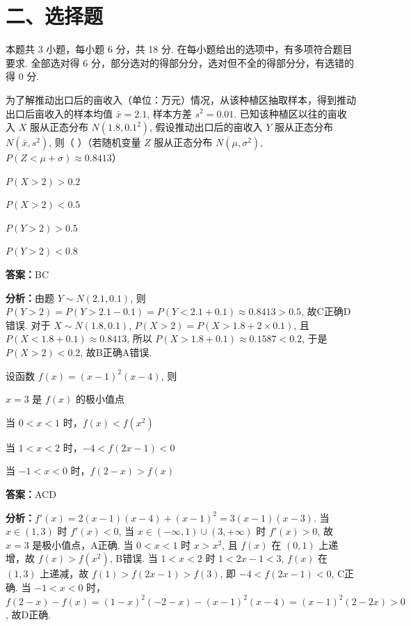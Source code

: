 \section*{二、选择题}
本题共 3 小题，每小题 6 分，共 18 分. 在每小题给出的选项中，有多项符合题目要求. 全部选对得 6 分，部分选对的得部分分，选对但不全的得部分分，有选错的得 0 分.

\begin{question}[points=6]
为了解推动出口后的亩收入（单位：万元）情况，从该种植区抽取样本，得到推动出口后亩收入的样本均值 $\bar{x}=2.1$, 样本方差 $s^2=0.01$. 已知该种植区以往的亩收入 $X$ 服从正态分布 $N(1.8, 0.1^2)$, 假设推动出口后的亩收入 $Y$ 服从正态分布 $N(\bar{x}, s^2)$, 则（ ）（若随机变量 $Z$ 服从正态分布 $N(\mu, \sigma^2)$, $P(Z < \mu+\sigma) \approx 0.8413$）
\begin{choices}
  \item $P(X > 2) > 0.2$
  \item $P(X > 2) < 0.5$
  \item $P(Y > 2) > 0.5$
  \item $P(Y > 2) < 0.8$
\end{choices}
\begin{solution}
\textbf{答案：}BC

\textbf{分析：}由题 $Y \sim N(2.1, 0.1)$, 则 $P(Y > 2) = P(Y > 2.1 - 0.1) = P(Y < 2.1+0.1) \approx 0.8413 > 0.5$, 故C正确D错误. 对于 $X \sim N(1.8, 0.1)$, $P(X>2) = P(X > 1.8+2\times 0.1)$, 且 $P(X < 1.8+0.1) \approx 0.8413$, 所以 $P(X > 1.8+0.1) \approx 0.1587 < 0.2$, 于是 $P(X>2) < 0.2$, 故B正确A错误.
\end{solution}
\end{question}

\begin{question}[points=6]
设函数 $f(x) = (x-1)^2(x-4)$, 则
\begin{choices}
  \item $x=3$ 是 $f(x)$ 的极小值点
  \item 当 $0 < x < 1$ 时，$f(x) < f(x^2)$
  \item 当 $1 < x < 2$ 时，$-4 < f(2x-1) < 0$
  \item 当 $-1 < x < 0$ 时，$f(2-x) > f(x)$
\end{choices}
\begin{solution}
\textbf{答案：}ACD

\textbf{分析：}$f'(x) = 2(x-1)(x-4) + (x-1)^2 = 3(x-1)(x-3)$. 当 $x \in (1,3)$ 时 $f'(x) < 0$, 当 $x \in (-\infty,1) \cup (3,+\infty)$ 时 $f'(x) > 0$, 故 $x=3$ 是极小值点，A正确. 当 $0<x<1$ 时 $x > x^2$, 且 $f(x)$ 在 $(0,1)$ 上递增，故 $f(x) > f(x^2)$, B错误. 当 $1<x<2$ 时 $1<2x-1<3$, $f(x)$ 在 $(1,3)$ 上递减，故 $f(1) > f(2x-1) > f(3)$, 即 $-4 < f(2x-1) < 0$, C正确. 当 $-1<x<0$ 时，$f(2-x) - f(x) = (1-x)^2(-2-x) - (x-1)^2(x-4) = (x-1)^2(2-2x) > 0$, 故D正确.
\end{solution}
\end{question}

